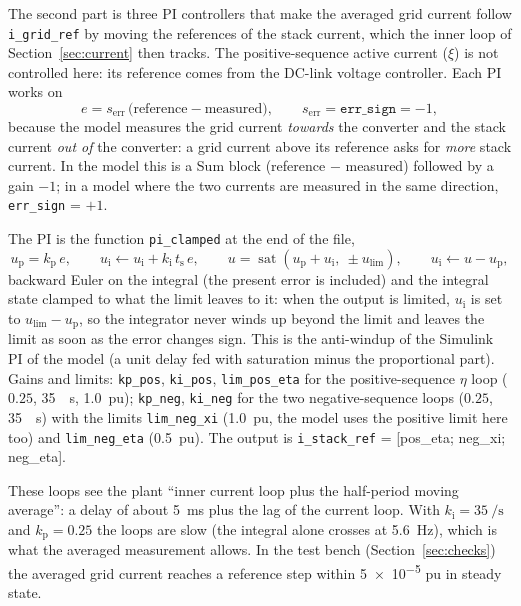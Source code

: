 \documentclass[11pt,a4paper]{scrartcl}
\newcommand{\ped}[1]{_{\mathrm{#1}}}
\newcommand{\code}[1]{\texttt{#1}}
\newcommand{\sat}{\operatorname{sat}}
\begin{document}
\begin{onehalfspace}
The second part is three PI controllers that make the averaged grid current follow \code{i\_grid\_ref} by moving the references of the stack current, which the inner loop of Section~\ref{sec:current} then tracks. The positive-sequence active current ($\xi$) is not controlled here: its reference comes from the DC-link voltage controller. Each PI works on
\begin{equation}
	e = s\ped{err}\,\big(\text{reference} - \text{measured}\big), \qquad s\ped{err} = \code{err\_sign} = -1,
	\label{eq:errsign}
\end{equation}
because the model measures the grid current \emph{towards} the converter and the stack current \emph{out of} the converter: a grid current above its reference asks for \emph{more} stack current. In the model this is a Sum block (reference $-$ measured) followed by a gain $-1$; in a model where the two currents are measured in the same direction, \code{err\_sign} = $+1$.

The PI is the function \code{pi\_clamped} at the end of the file,
\begin{equation}
	u\ped{p} = k\ped{p}\, e, \qquad u\ped{i} \leftarrow u\ped{i} + k\ped{i}\, t\ped{s}\, e, \qquad u = \sat(u\ped{p} + u\ped{i},\ \pm u\ped{lim}), \qquad u\ped{i} \leftarrow u - u\ped{p},
	\label{eq:pi_clamped}
\end{equation}
backward Euler on the integral (the present error is included) and the integral state clamped to what the limit leaves to it: when the output is limited, $u\ped{i}$ is set to $u\ped{lim} - u\ped{p}$, so the integrator never winds up beyond the limit and leaves the limit as soon as the error changes sign. This is the anti-windup of the Simulink PI of the model (a unit delay fed with saturation minus the proportional part). Gains and limits: \code{kp\_pos}, \code{ki\_pos}, \code{lim\_pos\_eta} for the positive-sequence $\eta$ loop ($0.25$, \SI{35}{\per\second}, \SI{1.0}{pu}); \code{kp\_neg}, \code{ki\_neg} for the two negative-sequence loops ($0.25$, \SI{35}{\per\second}) with the limits \code{lim\_neg\_xi} (\SI{1.0}{pu}, the model uses the positive limit here too) and \code{lim\_neg\_eta} (\SI{0.5}{pu}). The output is \code{i\_stack\_ref} = [pos\_eta; neg\_xi; neg\_eta].

These loops see the plant ``inner current loop plus the half-period moving average'': a delay of about \SI{5}{\milli\second} plus the lag of the current loop. With $k\ped{i} = \SI{35}{\per\second}$ and $k\ped{p} = 0.25$ the loops are slow (the integral alone crosses at \SI{5.6}{\hertz}), which is what the averaged measurement allows. In the test bench (Section~\ref{sec:checks}) the averaged grid current reaches a reference step within \num{5e-5} pu in steady state.


\end{onehalfspace}
\end{document}
